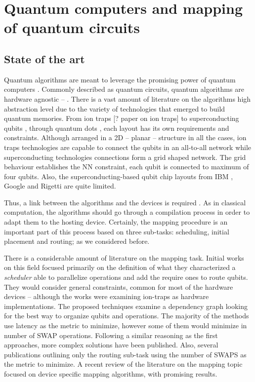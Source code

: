 
\chapter*{Quantum computers and mapping of quantum circuits}
\label{sec:orgaa5e1d6}
\section*{State of the art}
\label{sec:org53511bd}

Quantum algorithms are meant to leverage the promising power of quantum computers \cite{coles18:quant_algor_implem_begin}.
Commonly described as quantum circuits, quantum algorithms are hardware agnostic -- .
There is a vast amount of literature on the algorithms high abstraction level due to the variety of technologies that emerged to build quantum memories.
From ion traps [? paper on ion traps] to superconducting qubits \cite{Barends_2014,Versluis_2017}, through quantum dots \cite{Hill_2015,Li_2018}, each layout has its own requirements and constraints.
Although arranged in a 2D -- planar -- structure in all the cases, ion traps technologies are capable to connect the qubits in an all-to-all network while superconducting technologies connections form a grid shaped network.
The grid behaviour establishes the NN constraint, each qubit is connected to maximum of four qubits.
Also, the superconducting-based qubit chip layouts from IBM \cite{IBM_QX}, Google \cite{boixo16:charac_quant_suprem_near_term_devic} and Rigetti \cite{Sete_2016} are quite limited.

Thus, a link between the algorithms and the devices is required \cite{Fu_2016}.
As in classical computation, the algorithms should go through a compilation process in order to adapt them to the hosting device.
Certainly, the mapping procedure is an important part of this process based on three sub-tasks: scheduling, initial placement and routing; as we considered before.

There is a considerable amount of literature on the mapping task.
Initial works on this field \cite{Metodi_2006,Whitney_2007,Bahreini_2015} focused primarily on the definition of what they characterized a \emph{scheduler} able to parallelize operations and add the require ones to route qubits.
They would consider general constraints, common for most of the hardware devices -- although the works were examining ion-traps as hardware implementations.
The proposed techniques examine a dependency graph looking for the best way to organize qubits and operations.
The majority of the methods use latency as the metric to minimize, however some of them \cite{Farghadan_2017} would minimize in number of SWAP operations.
Following a similar reasoning as the first approaches, more complex solutions \cite{booth18:compar_integ_const_progr_tempor} have been published.
Also, several publications \cite{Lye_2015,Wille_2016} outlining only the routing sub-task using the number of SWAPS as the metric to minimize.
A recent review of the literature on the mapping topic \cite{zulehner17:effic_method_mappin_quant_circuit,Siraichi_2018,mckay18:qiskit_backen_specif_openq_openp_exper,Dueck_2018,Venturelli_2018} focused on device specific mapping algorithms, with promising results.


